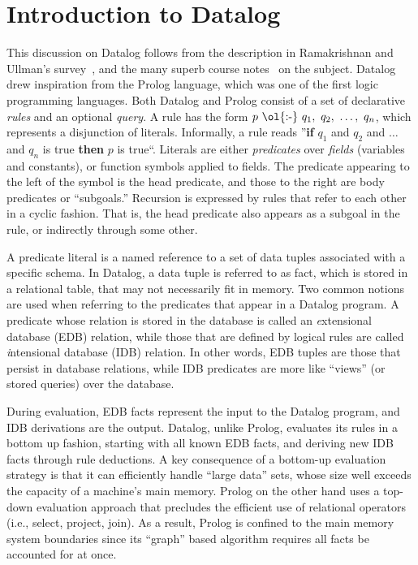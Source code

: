 \section{Introduction to Datalog}
\label{ch:p2:sec:datalog}

This discussion on Datalog follows from the description in Ramakrishnan and
Ullman's survey~\cite{deductive-database}, and the many superb course
notes~\cite{ullmanNotes} on the subject.  Datalog drew inspiration from the
Prolog language, which was one of the first logic programming languages.  Both
Datalog and Prolog consist of a set of declarative {\em rules} and an optional
{\em query}.  A rule has the form $p\ \text{\ol{:-}}\ q_1,\ q_2,\ \ldots,\
q_n$, which represents a disjunction of literals.  Informally, a rule reads
''{\bf if} $q_1$ and $q_2$ and $\ldots$ and $q_n$ is true {\bf then} $p$ is
true``.  Literals are either {\em predicates} over {\em fields} (variables and
constants), or function symbols applied to fields.  The predicate appearing to
the left of the \ol{:-} symbol is the head predicate, and those to the right
are body predicates or ``subgoals.'' Recursion is expressed by rules that refer
to each other in a cyclic fashion.  That is, the head predicate also appears as
a subgoal in the rule, or indirectly through some other.

A predicate literal is a named reference to a set of data tuples associated
with a specific schema.  In Datalog, a data tuple is referred to as fact, which
is stored in a relational table, that may not necessarily fit in memory.  Two
common notions are used when referring to the predicates that appear in a
Datalog program.  A predicate whose relation is stored in the database is
called an {\emph extensional database} (EDB) relation, while those that are
defined by logical rules are called {\emph intensional database} (IDB)
relation.  In other words, EDB tuples are those that persist in database
relations, while IDB predicates are more like ``views'' (or stored queries)
over the database.

During evaluation, EDB facts represent the input to the Datalog program, and
IDB derivations are the output.  Datalog, unlike Prolog, evaluates its rules in
a bottom up fashion, starting with all known EDB facts, and deriving new IDB
facts through rule deductions.  A key consequence of a bottom-up evaluation
strategy is that it can efficiently handle ``large data'' sets, whose size well
exceeds the capacity of a machine's main memory.  Prolog on the other hand uses
a top-down evaluation approach that precludes the efficient use of relational
operators (i.e., select, project, join).  As a result, Prolog is confined to
the main memory system boundaries since its ``graph'' based algorithm requires
all facts be accounted for at once.

